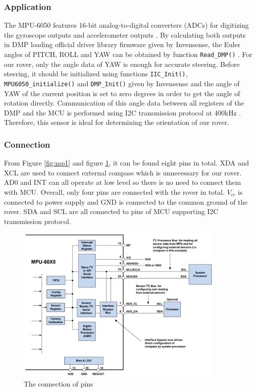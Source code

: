 \documentclass[12pt, a4paper, oneside]{report}
\begin{document}
\subsubsection{Application}
The MPU-6050 features 16-bit analog-to-digital converters (ADCs) for digitizing the gyroscope outputs and accelerometer outputs \cite{zzs2}. By calculating both outputs in DMP loading official driver library firmware given by Invensense, the Euler angles of PITCH, ROLL and YAW can be obtained by function \lstinline{Read_DMP()} \cite{zzs2}. For our rover, only the angle data of YAW is enough for accurate steering. Before steering, it should be initialized using functions \lstinline{IIC_Init()}, \lstinline{MPU6050_initialize()} and \lstinline{DMP_Init()} given by Invensense \cite{zzs2} and the angle of YAW of the current position is set to zero degrees in order to get the angle of rotation directly. Communication of this angle data between all registers of the DMP and the MCU is performed using I2C transmission protocol at 400kHz \cite{zzs2}. Therefore, this sensor is ideal for determining the orientation of our rover.

\subsubsection{Connection}
From Figure \ref{fig:mp1} and figure \ref{fig:mp3}, it can be found eight pins in total. XDA and XCL are used to connect external compass which is unnecessary for our rover. AD0 and INT can all operate at low level so there is no need to connect them with MCU. Overall, only four pins are connected with the rover in total. $V_{cc}$ is connected to power supply and GND is connected to the common ground of the rover. SDA and SCL are all connected to pins of MCU supporting I2C transmission protocol.

\begin{figure}[H]
  \centering
  \includegraphics[width=0.9\textwidth]{pic/Navigation/7.png}
  \caption{The connection of pins \cite{zzs2}}
  \label{fig:mp3}
\end{figure}
\end{document}
